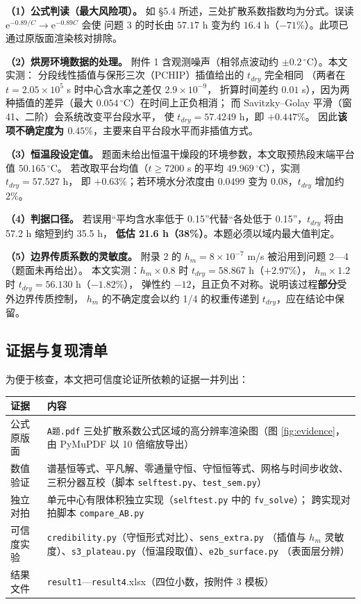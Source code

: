 \documentclass[12pt,a4paper]{ctexart}
\newcommand{\ee}{\mathrm{e}}
\begin{document}
\textbf{（1）公式判读（最大风险项）。}
如 \S5.4 所述，三处扩散系数指数均为分式。误读 $\ee^{-0.89/C}\to\ee^{-0.89C}$ 会使
问题 3 的时长由 $57.17$ h 变为约 $16.4$ h（$-71\%$）。此项已通过原版面渲染核对排除。

\textbf{（2）烘房环境数据的处理。}
附件 1 含观测噪声（相邻点波动约 $\pm0.2\,^\circ$C）。本文实测：
分段线性插值与保形三次（PCHIP）插值给出的 $t_{dry}$ 完全相同
（两者在 $t=2.05\times10^5$ s 时中心含水率之差仅 $2.9\times10^{-9}$，
折算时间差约 $0.01$ s），因为两种插值的差异（最大 $0.054\,^\circ$C）在时间上正负相消；
而 Savitzky--Golay 平滑（窗 41、二阶）会系统改变平台段水平，
使 $t_{dry}=57.4249$ h，即 $+0.447\%$。
因此\textbf{该项不确定度为 $0.45\%$}，主要来自平台段水平而非插值方式。

\textbf{（3）恒温段设定值。}
题面未给出恒温干燥段的环境参数，本文取预热段末端平台值 $50.165\,^\circ$C。
若改取平台均值（$t\ge7200$ s 的平均 $49.969\,^\circ$C），实测 $t_{dry}=57.527$ h，
即 $+0.63\%$；若环境水分浓度由 $0.0499$ 变为 $0.08$，$t_{dry}$ 增加约 $2\%$。

\textbf{（4）判据口径。}
若误用“平均含水率低于 0.15”代替“各处低于 0.15”，$t_{dry}$ 将由 57.2 h 缩短到约 35.5 h，
\textbf{低估 21.6 h（38\%）}。本题必须以域内最大值判定。

\textbf{（5）边界传质系数的灵敏度。}
附录 2 的 $h_m=8\times10^{-7}$ m/s 被沿用到问题 2—4（题面未再给出）。
本文实测：$h_m\times0.8$ 时 $t_{dry}=58.867$ h（$+2.97\%$），
$h_m\times1.2$ 时 $t_{dry}=56.130$ h（$-1.82\%$），
弹性约 $-12$，且正负不对称。说明该过程\textbf{部分}受外边界传质控制，
$h_m$ 的不确定度会以约 1/4 的权重传递到 $t_{dry}$，应在结论中保留。

\subsection{证据与复现清单}

为便于核查，本文把可信度论证所依赖的证据一并列出：

\begin{center}
\small
\begin{tabular}{@{}p{3.4cm}p{10.6cm}@{}}
\toprule
证据 & 内容 \\
\midrule
公式原版面 & \texttt{A题.pdf} 三处扩散系数公式区域的高分辨率渲染图（图 \ref{fig:evidence}，
由 PyMuPDF 以 10 倍缩放导出） \\
数值验证 & 谱基恒等式、平凡解、零通量守恒、守恒恒等式、网格与时间步收敛、
三积分器互校（脚本 \texttt{selftest.py}、\texttt{test\_sem.py}） \\
独立对拍 & 单元中心有限体积独立实现（\texttt{selftest.py} 中的 \texttt{fv\_solve}）；
跨实现对拍脚本 \texttt{compare\_AB.py} \\
可信度实验 & \texttt{credibility.py}（守恒形式对比）、\texttt{sens\_extra.py}
（插值与 $h_m$ 灵敏度）、\texttt{s3\_plateau.py}（恒温段取值）、\texttt{e2b\_surface.py}
（表面层分辨） \\
结果文件 & \texttt{result1}—\texttt{result4}.xlsx（四位小数，按附件 3 模板） \\
\bottomrule
\end{tabular}
\end{center}
\end{document}
